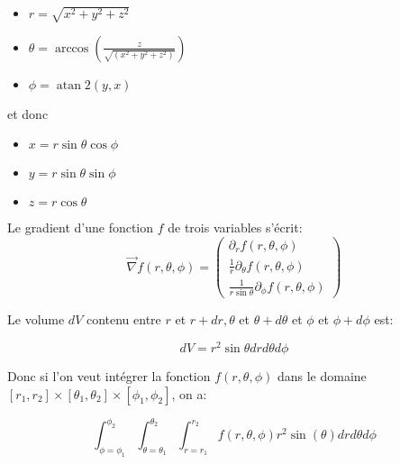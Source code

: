 \begin{itemize}
    \item $r=\sqrt{x^2+y^2+z^2}$
    \item $\theta=\arccos \left(\frac{z}{\sqrt{\left(x^2+y^2+z^2\right)}}\right)$
    \item $\phi=\operatorname{atan} 2(y, x)$
\end{itemize}
et donc 
\begin{itemize}
    \item $x=r \sin \theta \cos \phi$
    \item $y=r \sin \theta \sin \phi$
    \item $z=r \cos \theta$
\end{itemize}

Le gradient d'une fonction $f$ de trois variables s'écrit:
$$
\vec{\nabla} f(r, \theta, \phi)=\left(\begin{array}{c}
\partial_r f(r, \theta, \phi) \\
\frac{1}{r} \partial_\theta f(r, \theta, \phi) \\
\frac{1}{r \sin \theta} \partial_\phi f(r, \theta, \phi)
\end{array}\right)
$$

Le volume $d V$ contenu entre $r$ et $r+d r, \theta$ et $\theta+d \theta$ et $\phi$ et $\phi+d \phi$ est:

$$
d V=r^2 \sin \theta d r d \theta d \phi
$$


Donc si l'on veut intégrer la fonction $f(r, \theta, \phi)$ dans le domaine $\left[r_1, r_2\right] \times\left[\theta_1, \theta_2\right] \times \left[\phi_1, \phi_2\right]$, on a:

$$
\int_{\phi=\phi_1}^{\phi_2} \int_{\theta=\theta_1}^{\theta_2} \int_{r=r_1}^{r_2} f(r, \theta, \phi) r^2 \sin (\theta) d r d \theta d \phi
$$
